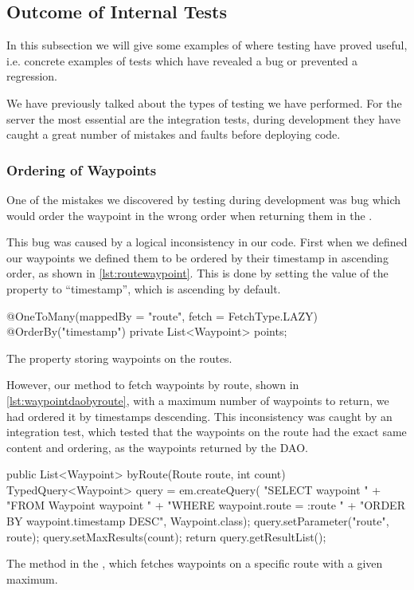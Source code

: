 \subsection{Outcome of Internal Tests} %
In this subsection we will give some examples of where testing have proved useful,
i.e. concrete examples of tests which have revealed a bug or prevented a regression.

We have previously talked about the types of testing we have performed.
For the server the most essential are the integration tests,
during development they have caught a great number of mistakes and faults before deploying code.

\subsubsection*{Ordering of Waypoints}
One of the mistakes we discovered by testing during development was bug which would order the waypoint in the wrong order when returning them in the .

This bug was caused by a logical inconsistency in our code.
First when we defined our waypoints we defined them to be ordered by their timestamp in ascending order, as shown in \cref{lst:routewaypoint}.
This is done by setting the value of the  property to ``timestamp'', which is ascending by default.
\begin{listing}
    \begin{java2}
@OneToMany(mappedBy = "route", fetch = FetchType.LAZY)
@OrderBy("timestamp")
private List<Waypoint> points;
    \end{java2}
    \caption{The property storing waypoints on the routes.}
    \label{lst:routewaypoint}
\end{listing}

However, our method to fetch waypoints by route, shown in \cref{lst:waypointdaobyroute}, with a maximum number of waypoints to return,
we had ordered it by timestamps descending.
This inconsistency was caught by an integration test, which tested that the waypoints on the route had the exact same content and ordering, as the waypoints returned by the \ac{DAO}. 
\begin{listing}
    \begin{java2}
public List<Waypoint> byRoute(Route route, int count) {
    TypedQuery<Waypoint> query = em.createQuery(
        "SELECT waypoint " +
            "FROM Waypoint waypoint " +
            "WHERE waypoint.route = :route " +
            "ORDER BY waypoint.timestamp DESC", Waypoint.class);
    query.setParameter("route", route);
    query.setMaxResults(count);
    return query.getResultList();
}
    \end{java2}
    \caption{The method in the , which fetches waypoints on a specific route with a given maximum.}
    \label{lst:waypointdaobyroute}
\end{listing}

